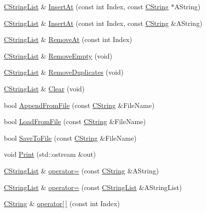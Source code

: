 \begin{DoxyCompactItemize}
\item 
\hyperlink{classCStringList}{C\-String\-List} \& \hyperlink{classCStringList_ad3f79584d3ca54478a41442bc92462d8}{Insert\-At} (const int Index, const \hyperlink{classCString}{C\-String} $\ast$A\-String)
\item 
\hyperlink{classCStringList}{C\-String\-List} \& \hyperlink{classCStringList_a54b5bba3ad6620a1506184f6a4a20f06}{Insert\-At} (const int Index, const \hyperlink{classCString}{C\-String} \&A\-String)
\item 
\hyperlink{classCStringList}{C\-String\-List} \& \hyperlink{classCStringList_ad8b01958de9cd1e675969b78d175c1ca}{Remove\-At} (const int Index)
\item 
\hyperlink{classCStringList}{C\-String\-List} \& \hyperlink{classCStringList_a7cbb71dee911b10c577a26ed47493bc5}{Remove\-Empty} (void)
\item 
\hyperlink{classCStringList}{C\-String\-List} \& \hyperlink{classCStringList_a3598e4809c05f70f97fca169949bf2a2}{Remove\-Duplicates} (void)
\item 
\hyperlink{classCStringList}{C\-String\-List} \& \hyperlink{classCStringList_a563db5b1c201a9db6386284f8fb7ba75}{Clear} (void)
\item 
bool \hyperlink{classCStringList_a1ddee6028388f2af0641b39dbb796fde}{Append\-From\-File} (const \hyperlink{classCString}{C\-String} \&File\-Name)
\item 
bool \hyperlink{classCStringList_a98ff4f6bd7b940cc6bc3356e2ca9130e}{Load\-From\-File} (const \hyperlink{classCString}{C\-String} \&File\-Name)
\item 
bool \hyperlink{classCStringList_a305df4ec24936fe8be8fb0354856669c}{Save\-To\-File} (const \hyperlink{classCString}{C\-String} \&File\-Name)
\item 
void \hyperlink{classCStringList_ac923e1c0f87f0a979135b7ce46afe63c}{Print} (std\-::ostream \&out)
\item 
\hyperlink{classCStringList}{C\-String\-List} \& \hyperlink{classCStringList_a08327987a556b60898c242dac6501857}{operator=} (const \hyperlink{classCString}{C\-String} \&A\-String)
\item 
\hyperlink{classCStringList}{C\-String\-List} \& \hyperlink{classCStringList_a924ddeb20e3f122b561a8c931b482a70}{operator=} (const \hyperlink{classCStringList}{C\-String\-List} \&A\-String\-List)
\item 
\hyperlink{classCString}{C\-String} \& \hyperlink{classCStringList_a9b2b556fdd5bc5535269d782fc80c6e1}{operator\mbox{[}$\,$\mbox{]}} (const int Index)

\end{DoxyCompactItemize}
